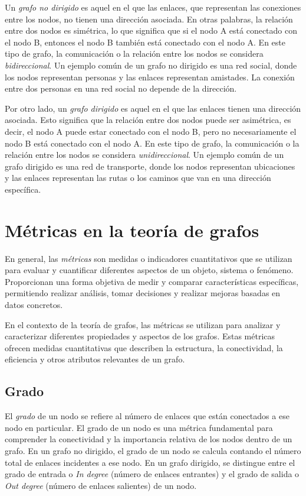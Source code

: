 Un \textit{grafo no dirigido} es aquel en el que las enlaces, que representan las conexiones
entre los nodos, no tienen una dirección asociada. En otras palabras, la relación entre dos
nodos es simétrica, lo que significa que si el nodo A está conectado con el nodo B,
entonces el nodo B también está conectado con el nodo A. En este tipo de grafo, la comunicación
o la relación entre los nodos se considera \textit{bidireccional}. Un ejemplo común de un grafo no
dirigido es una red social, donde los nodos representan personas y las enlaces representan
amistades. La conexión entre dos personas en una red social no depende de la dirección.

Por otro lado, un \textit{grafo dirigido} es aquel en el que las enlaces tienen una dirección
asociada. Esto significa que la relación entre dos nodos puede ser asimétrica, es decir, el
nodo A puede estar conectado con el nodo B, pero no necesariamente el nodo B está conectado
con el nodo A. En este tipo de grafo, la comunicación o la relación entre los nodos se considera
\textit{unidireccional}. Un ejemplo común de un grafo dirigido es una red de transporte, donde los
nodos representan ubicaciones y las enlaces representan las rutas o los caminos que van en una
dirección específica.

\section{Métricas en la teoría de grafos}

En general, las \textit{métricas} son medidas o indicadores cuantitativos que se utilizan para evaluar
y cuantificar diferentes aspectos de un objeto, sistema o fenómeno. Proporcionan una forma objetiva de medir y
comparar características específicas, permitiendo realizar análisis, tomar decisiones y realizar
mejoras basadas en datos concretos.

En el contexto de la teoría de grafos, las métricas se utilizan para analizar y caracterizar diferentes
propiedades y aspectos de los grafos. Estas métricas ofrecen medidas cuantitativas que describen la
estructura, la conectividad, la eficiencia y otros atributos relevantes de un grafo.

\subsection{Grado}

El \textit{grado} de un nodo se refiere al número de enlaces que están conectados a ese nodo
en particular. El grado de un nodo es una métrica fundamental para comprender la conectividad 
y la importancia relativa de los nodos dentro de un grafo. En un grafo no dirigido, el grado 
de un nodo se calcula contando el número total de enlaces incidentes a ese nodo. En un grafo 
dirigido, se distingue entre el grado de entrada o \textit{In degree} (número de enlaces entrantes) 
y el grado de salida o \textit{Out degree} (número de enlaces salientes) de un nodo.

